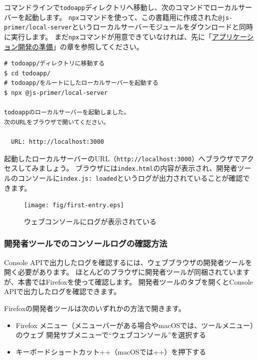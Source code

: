 コマンドラインで\texttt{todoapp}ディレクトリへ移動し、次のコマンドでローカルサーバーを起動します。
\texttt{npx}コマンドを使って、この書籍用に作成された\texttt{@js-primer/local-server}というローカルサーバーモジュールをダウンロードと同時に実行します。
まだ\texttt{npx}コマンドが用意できていなければ、先に「\hyperlink{setup-local-env}{アプリケーション開発の準備}」の章を参照してください。

\begin{lstlisting}
# todoapp/ディレクトリに移動する
$ cd todoapp/
# todoapp/をルートにしたローカルサーバーを起動する
$ npx @js-primer/local-server

todoappのローカルサーバーを起動しました。
次のURLをブラウザで開いてください。

  URL: http://localhost:3000
\end{lstlisting}

起動したローカルサーバーのURL（\texttt{http://localhost:3000}）へブラウザでアクセスしてみましょう。
ブラウザには\texttt{index.html}の内容が表示され、開発者ツールのコンソールに\texttt{index.js: loaded}というログが出力されていることが確認できます。

\begin{figure}[h]
\centering
\texttt{[image: fig/first-entry.eps]}
\caption{ウェブコンソールにログが表示されている}
\end{figure}

\hypertarget{view-console-log-in-dev-tools}{%
\subsubsection{開発者ツールでのコンソールログの確認方法}\label{view-console-log-in-dev-tools}}

Console
APIで出力したログを確認するには、ウェブブラウザの開発者ツールを開く必要があります。
ほとんどのブラウザに開発者ツールが同梱されていますが、本書ではFirefoxを使って確認します。
開発者ツールの\textbf{}タブを開くとConsole
APIで出力したログを確認できます。

Firefoxの開発者ツールは次のいずれかの方法で開きます。

\begin{itemize}
\item
  Firefox
  メニュー（メニューバーがある場合やmacOSでは、ツールメニュー）のウェブ
  開発サブメニューで``ウェブコンソール''を選択する
\item
  キーボードショートカット++（macOSでは++）を押下する
\end{itemize}

